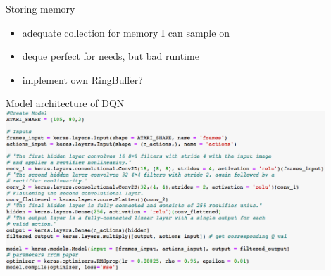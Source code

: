 \documentclass{beamer}
\begin{document}
\begin{frame}{Storing memory}
\begin{itemize}
\item adequate collection for memory I can sample on
\item deque perfect for needs, but bad runtime
\item implement own RingBuffer?
\end{itemize}

\end{frame}
\begin{frame}{Model architecture of DQN}
\centering
\includegraphics[width = 12cm]{Images/model-code2}
\end{frame}
\end{document}
